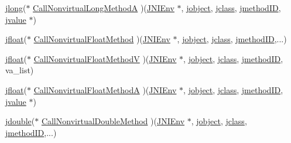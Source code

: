 \begin{DoxyCompactItemize}
\item 
\hyperlink{jni_8h_ab9b0f43bf72fd26315ed0165966ddb25}{jlong}($\ast$ \hyperlink{struct_j_n_i_native_interface_aa03debe9361fa56800b5d08de67db5ca}{Call\-Nonvirtual\-Long\-Method\-A} )(\hyperlink{jni_8h_a2d06d32b6b6f1519799078a36fe2e380}{J\-N\-I\-Env} $\ast$, \hyperlink{jni_8h_a24647d2a2f02c39f6338c2c6ce4c1004}{jobject}, \hyperlink{jni_8h_a5b236a554a9caf14a835f4e83b4c16b3}{jclass}, \hyperlink{jni_8h_a91d8a65fefade9d27c9f749e69f37c40}{jmethod\-I\-D}, \hyperlink{unionjvalue}{jvalue} $\ast$)
\item 
\hyperlink{jni_8h_a5d393cee6f500e76ac60e7e29279bf17}{jfloat}($\ast$ \hyperlink{struct_j_n_i_native_interface_ab21f3dec305b2f0b72637a954d656a2f}{Call\-Nonvirtual\-Float\-Method} )(\hyperlink{jni_8h_a2d06d32b6b6f1519799078a36fe2e380}{J\-N\-I\-Env} $\ast$, \hyperlink{jni_8h_a24647d2a2f02c39f6338c2c6ce4c1004}{jobject}, \hyperlink{jni_8h_a5b236a554a9caf14a835f4e83b4c16b3}{jclass}, \hyperlink{jni_8h_a91d8a65fefade9d27c9f749e69f37c40}{jmethod\-I\-D},...)
\item 
\hyperlink{jni_8h_a5d393cee6f500e76ac60e7e29279bf17}{jfloat}($\ast$ \hyperlink{struct_j_n_i_native_interface_af0a7355b353ab3fc0dc61060d8211172}{Call\-Nonvirtual\-Float\-Method\-V} )(\hyperlink{jni_8h_a2d06d32b6b6f1519799078a36fe2e380}{J\-N\-I\-Env} $\ast$, \hyperlink{jni_8h_a24647d2a2f02c39f6338c2c6ce4c1004}{jobject}, \hyperlink{jni_8h_a5b236a554a9caf14a835f4e83b4c16b3}{jclass}, \hyperlink{jni_8h_a91d8a65fefade9d27c9f749e69f37c40}{jmethod\-I\-D}, va\-\_\-list)
\item 
\hyperlink{jni_8h_a5d393cee6f500e76ac60e7e29279bf17}{jfloat}($\ast$ \hyperlink{struct_j_n_i_native_interface_aabdf8f6a6088bb63d1a709cbd6409b4d}{Call\-Nonvirtual\-Float\-Method\-A} )(\hyperlink{jni_8h_a2d06d32b6b6f1519799078a36fe2e380}{J\-N\-I\-Env} $\ast$, \hyperlink{jni_8h_a24647d2a2f02c39f6338c2c6ce4c1004}{jobject}, \hyperlink{jni_8h_a5b236a554a9caf14a835f4e83b4c16b3}{jclass}, \hyperlink{jni_8h_a91d8a65fefade9d27c9f749e69f37c40}{jmethod\-I\-D}, \hyperlink{unionjvalue}{jvalue} $\ast$)
\item 
\hyperlink{jni_8h_a4dbf307878725eebfb852c2800a951fa}{jdouble}($\ast$ \hyperlink{struct_j_n_i_native_interface_a3739bbec960d6208f327c3133241ca63}{Call\-Nonvirtual\-Double\-Method} )(\hyperlink{jni_8h_a2d06d32b6b6f1519799078a36fe2e380}{J\-N\-I\-Env} $\ast$, \hyperlink{jni_8h_a24647d2a2f02c39f6338c2c6ce4c1004}{jobject}, \hyperlink{jni_8h_a5b236a554a9caf14a835f4e83b4c16b3}{jclass}, \hyperlink{jni_8h_a91d8a65fefade9d27c9f749e69f37c40}{jmethod\-I\-D},...)
\item 

\end{DoxyCompactItemize}
